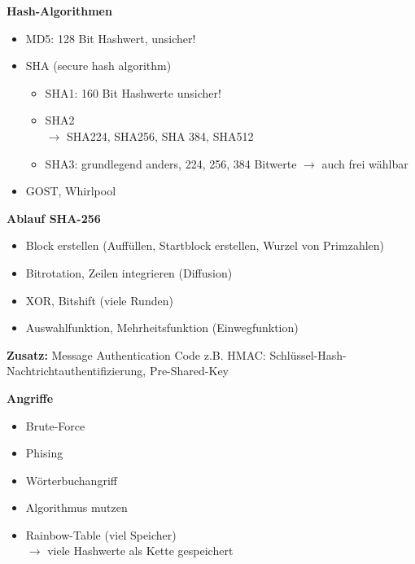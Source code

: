 \textbf{Hash-Algorithmen}
\begin{itemize}
	\item MD5: 128 Bit Hashwert, unsicher!
	\item SHA (secure hash algorithm)
	\begin{itemize}
		\item SHA1: 160 Bit Hashwerte unsicher!
		\item SHA2 \\
		$\rightarrow$ SHA224, SHA256, SHA 384, SHA512
		\item SHA3: grundlegend anders, 224, 256, 384 Bitwerte $\rightarrow$ auch frei wählbar
	\end{itemize}
	\item GOST, Whirlpool
\end{itemize}

\textbf{Ablauf SHA-256} 
\begin{itemize}
	\item Block erstellen (Auffüllen, Startblock erstellen, Wurzel von Primzahlen)
	\item Bitrotation, Zeilen integrieren (Diffusion)
	\item XOR, Bitshift (viele Runden)
	\item Auswahlfunktion, Mehrheitsfunktion (Einwegfunktion)
\end{itemize}

\textbf{Zusatz:} Message Authentication Code z.B. HMAC: Schlüssel-Hash-Nachtrichtauthentifizierung, Pre-Shared-Key

\textbf{Angriffe}
\begin{itemize}
	\item Brute-Force
	\item Phising
	\item Wörterbuchangriff
	\item Algorithmus mutzen
	\item Rainbow-Table (viel Speicher) \\
	$\rightarrow$ viele Hashwerte als Kette gespeichert
\end{itemize}

